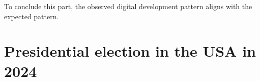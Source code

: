 To conclude this part, the observed digital development pattern aligns with the expected pattern.  












\newpage

\section{Presidential election in the USA in 2024} 

